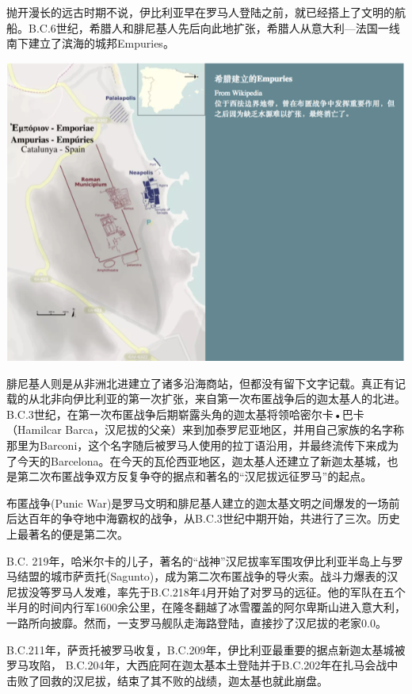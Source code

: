 \documentclass[]{book}
\begin{document}
抛开漫长的远古时期不说，伊比利亚早在罗马人登陆之前，就已经搭上了文明的航船。B.C.6世纪，希腊人和腓尼基人先后向此地扩张，希腊人从意大利---法国一线南下建立了滨海的城邦Empuries。

\includegraphics[width=8.33in]{images/xt11}

腓尼基人则是从非洲北进建立了诸多沿海商站，但都没有留下文字记载。真正有记载的从北非向伊比利亚的第一次扩张，来自第一次布匿战争后的迦太基人的北进。B.C.3世纪，在第一次布匿战争后期崭露头角的迦太基将领哈密尔卡•巴卡（Hamilcar Barca，汉尼拔的父亲）来到加泰罗尼亚地区，并用自己家族的名字称那里为Barconi，这个名字随后被罗马人使用的拉丁语沿用，并最终流传下来成为了今天的Barcelona。在今天的瓦伦西亚地区，迦太基人还建立了新迦太基城，也是第二次布匿战争双方反复争夺的据点和著名的``汉尼拔远征罗马''的起点。

布匿战争(Punic War)是罗马文明和腓尼基人建立的迦太基文明之间爆发的一场前后达百年的争夺地中海霸权的战争，从B.C.3世纪中期开始，共进行了三次。历史上最著名的便是第二次。

B.C. 219年，哈米尔卡的儿子，著名的``战神''汉尼拔率军围攻伊比利亚半岛上与罗马结盟的城市萨贡托(Sagunto)，成为第二次布匿战争的导火索。战斗力爆表的汉尼拔没等罗马人发难，率先于B.C.218年4月开始了对罗马的远征。他的军队在五个半月的时间内行军1600余公里，在隆冬翻越了冰雪覆盖的阿尔卑斯山进入意大利，一路所向披靡。然而，一支罗马舰队走海路登陆，直接抄了汉尼拔的老家0.0。

B.C.211年，萨贡托被罗马收复，B.C.209年，伊比利亚最重要的据点新迦太基城被罗马攻陷， B.C.204年，大西庇阿在迦太基本土登陆并于B.C.202年在扎马会战中击败了回救的汉尼拔，结束了其不败的战绩，迦太基也就此崩盘。
\end{document}
